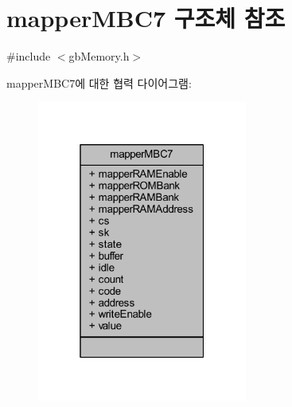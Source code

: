 \hypertarget{structmapper_m_b_c7}{}\section{mapper\+M\+B\+C7 구조체 참조}
\label{structmapper_m_b_c7}


{\ttfamily \#include $<$gb\+Memory.\+h$>$}



mapper\+M\+B\+C7에 대한 협력 다이어그램\+:\nopagebreak
\begin{figure}[H]
\begin{center}
\leavevmode
\includegraphics[width=196pt]{structmapper_m_b_c7__coll__graph}
\end{center}
\end{figure}
